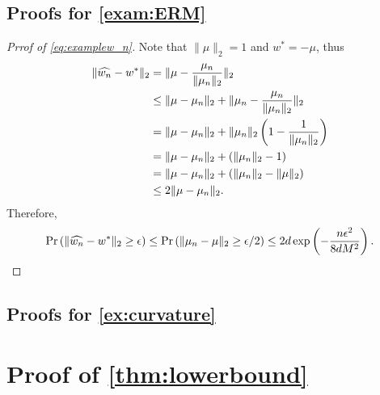 \subsection{Proofs for \cref{exam:ERM}}
\begin{proof}[Prrof of \cref{eq:examplew_n}]
Note that $\|\mu\|_2 = 1$ and $w^* = -\mu$, thus
\begin{align*}
\|\widehat{w_n} - w^*\|_2 & = \|\mu - \frac{\mu_n}{\|\mu_n\|_2}\|_2 \\
	& \le \|\mu - \mu_n\|_2 + \|\mu_n - \frac{\mu_n}{\|\mu_n\|_2}\|_2 \\
	& = \|\mu - \mu_n\|_2 + \|\mu_n\|_2\left( 1- \frac{1}{\|\mu_n\|_2}\right) \\
	& = \|\mu - \mu_n\|_2 + (\|\mu_n\|_2- 1) \\
	& = \|\mu - \mu_n\|_2 + (\|\mu_n\|_2- \|\mu\|_2) \\
	& \le 2\|\mu - \mu_n\|_2.
\end{align*}
Therefore,
\[
\Pr\left( \|\widehat{w_n} - w^*\|_2 \ge \epsilon \right) \le \Pr\left( \|\mu_n - \mu\|_2 \ge \epsilon/2 \right) \le 2d\exp\left(-\frac{n\epsilon^2}{8dM^2}\right).
\]
\end{proof}
\fi

\subsection{Proofs for \cref{ex:curvature}}







\section{Proof of \cref{thm:lowerbound}}

